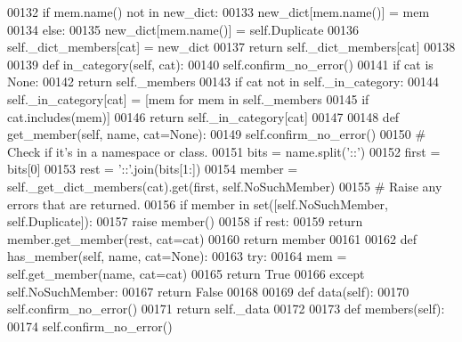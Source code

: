 \begin{DoxyCode}
{00132                 \textcolor{keywordflow}{if} mem.name() \textcolor{keywordflow}{not} \textcolor{keywordflow}{in} new\_dict:
00133                     new\_dict[mem.name()] = mem
00134                 \textcolor{keywordflow}{else}:
00135                     new\_dict[mem.name()] = self.Duplicate
00136             self._dict_members[cat] = new\_dict
00137         \textcolor{keywordflow}{return} self._dict_members[cat]
00138 
00139     \textcolor{keyword}{def }in_category(self, cat):
00140         self.confirm_no_error()
00141         \textcolor{keywordflow}{if} cat \textcolor{keywordflow}{is} \textcolor{keywordtype}{None}:
00142             \textcolor{keywordflow}{return} self._members
00143         \textcolor{keywordflow}{if} cat \textcolor{keywordflow}{not} \textcolor{keywordflow}{in} self._in_category:
00144             self._in_category[cat] = [mem \textcolor{keywordflow}{for} mem \textcolor{keywordflow}{in} self._members
00145                                       \textcolor{keywordflow}{if} cat.includes(mem)]
00146         \textcolor{keywordflow}{return} self._in_category[cat]
00147 
00148     \textcolor{keyword}{def }get_member(self, name, cat=None):
00149         self.confirm_no_error()
00150         \textcolor{comment}{# Check if it's in a namespace or class.}
00151         bits = name.split(\textcolor{stringliteral}{'::'})
00152         first = bits[0]
00153         rest = \textcolor{stringliteral}{'::'}.join(bits[1:])
00154         member = self._get_dict_members(cat).get(first, self.NoSuchMember)
00155         \textcolor{comment}{# Raise any errors that are returned.}
00156         \textcolor{keywordflow}{if} member \textcolor{keywordflow}{in} set([self.NoSuchMember, self.Duplicate]):
00157             \textcolor{keywordflow}{raise} member()
00158         \textcolor{keywordflow}{if} rest:
00159             \textcolor{keywordflow}{return} member.get\_member(rest, cat=cat)
00160         \textcolor{keywordflow}{return} member
00161 
00162     \textcolor{keyword}{def }has_member(self, name, cat=None):
00163         \textcolor{keywordflow}{try}:
00164             mem = self.get_member(name, cat=cat)
00165             \textcolor{keywordflow}{return} \textcolor{keyword}{True}
00166         \textcolor{keywordflow}{except} self.NoSuchMember:
00167             \textcolor{keywordflow}{return} \textcolor{keyword}{False}
00168 
00169     \textcolor{keyword}{def }data(self):
00170         self.confirm_no_error()
00171         \textcolor{keywordflow}{return} self._data
00172 
00173     \textcolor{keyword}{def }members(self):
00174         self.confirm_no_error()
}
\end{DoxyCode}
